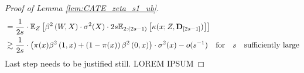 \begin{proof}[Proof of Lemma \ref{lem:CATE_zeta_s1_ub}]
\begin{equation}
\begin{aligned}
            & = \frac{1}{2s} \cdot \mathbb{E}_{Z}\left[\beta^{2}\left(W, X\right) \cdot \sigma^{2}(X) \cdot 2s\mathbb{E}_{2:(2s-1)}\left[\kappa(x; Z, \mathbf{D}_{[2s - 1]})\right]\right]\\
            & \gtrsim \frac{1}{2s} \cdot \left(\pi(x) \beta^{2}\left(1 , x\right) + \left(1-\pi(x)\right) \beta^{2}\left(0 , x\right) \right)\cdot \sigma^{2}(x) - o(s^{-1}) \quad 
            \text{for} \quad s \quad \text{sufficiently large}
         \end{aligned}
     \end{equation}
    {\color{red} Last step needs to be justified still. LOREM IPSUM}
\end{proof}

